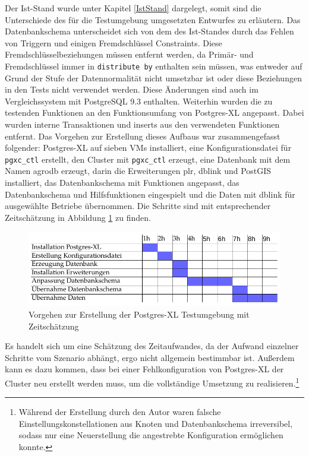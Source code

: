 Der Ist-Stand wurde unter Kapitel \ref{IstStand} dargelegt, somit sind die Unterschiede des für die Testumgebung umgesetzten Entwurfes zu erläutern.
Das Datenbankschema unterscheidet sich von dem des Ist-Standes durch das Fehlen von Triggern und einigen Fremdschlüssel Constraints.
Diese Fremdschlüsselbeziehungen müssen entfernt werden, da Primär- und Fremdschlüssel immer in \verb+distribute by+ enthalten sein müssen, was entweder auf Grund der Stufe der Datennormalität nicht umsetzbar ist oder diese Beziehungen in den Tests nicht verwendet werden.
Diese Änderungen sind auch im Vergleichssystem mit PostgreSQL 9.3 enthalten.
Weiterhin wurden die zu testenden Funktionen an den Funktionsumfang von Postgres-XL angepasst.
Dabei wurden interne Transaktionen und inserts aus den verwendeten Funktionen entfernt.
Das Vorgehen zur Erstellung dieses Aufbaus war zusammengefasst folgender:
Postgres-XL auf sieben VMs installiert, eine Konfigurationsdatei für \verb+pgxc_ctl+ erstellt, den Cluster mit \verb+pgxc_ctl+ erzeugt, eine Datenbank mit dem Namen agrodb erzeugt, darin die Erweiterungen plr, dblink und PostGIS installiert, das Datenbankschema mit Funktionen angepasst, das Datenbankschema und Hilfsfunktionen eingespielt und die Daten mit dblink für ausgewählte Betriebe übernommen.
Die Schritte sind mit entsprechender Zeitschätzung in Abbildung \ref{fig:getan} zu finden.

\begin{figure}[h!]
\centering
\includegraphics[width=.8\textwidth]{Abbildungen/gantt_done_cropped.pdf}
\caption[Vorgehen zur Erstellung der Postgres-XL Testumgebung]{Vorgehen zur Erstellung der Postgres-XL Testumgebung mit Zeitschätzung}
\label{fig:getan}
\end{figure}
Es handelt sich um eine Schätzung des Zeitaufwandes, da der Aufwand einzelner Schritte vom Szenario abhängt, ergo nicht allgemein bestimmbar ist.
Außerdem kann es dazu kommen, dass bei einer Fehlkonfiguration von Postgres-XL der Cluster neu erstellt werden muss, um die vollständige Umsetzung zu realisieren.\footnote{Während der Erstellung durch den Autor waren falsche Einstellungskonstellationen aus Knoten und Datenbankschema irreversibel, sodass nur eine Neuerstellung die angestrebte Konfiguration ermöglichen konnte.}

